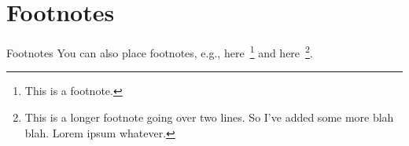 \section{Footnotes}
\begin{frame}{Footnotes}
  You can also place footnotes, e.g.,
  here~\footnote{This is a footnote.}
  and here~\footnote{This is a longer footnote going over two lines.
    So I've added some more blah blah. Lorem ipsum whatever.}.
\end{frame}